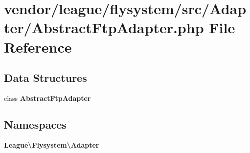 \section{vendor/league/flysystem/src/\+Adapter/\+Abstract\+Ftp\+Adapter.php File Reference}
\label{_abstract_ftp_adapter_8php}
\subsection*{Data Structures}
\begin{DoxyCompactItemize}
\item 
class {\bf Abstract\+Ftp\+Adapter}
\end{DoxyCompactItemize}
\subsection*{Namespaces}
\begin{DoxyCompactItemize}
\item 
 {\bf League\textbackslash{}\+Flysystem\textbackslash{}\+Adapter}
\end{DoxyCompactItemize}
